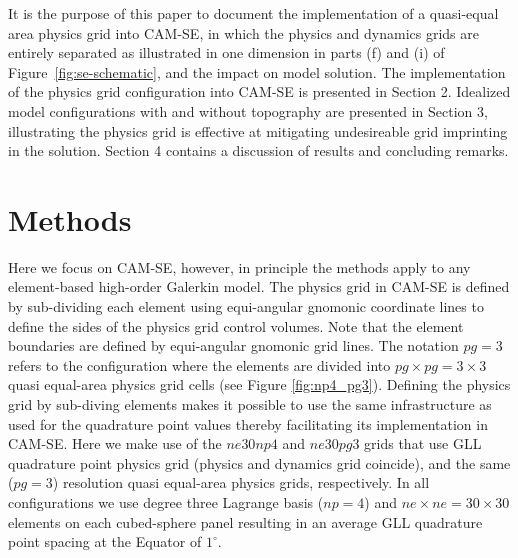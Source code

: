 \documentclass[twocol]{ametsoc}
\begin{document}


It is the purpose of this paper to document the implementation of a quasi-equal area physics grid into CAM-SE, in which the physics and dynamics grids are entirely separated as illustrated in one dimension in parts (f) and (i) of Figure~\ref{fig:se-schematic}, and the impact on model solution. The implementation of the physics grid configuration into CAM-SE is presented in Section 2. Idealized model configurations with and without topography are presented in Section 3, illustrating the physics grid is effective at mitigating undesireable grid imprinting in the solution. Section 4 contains a discussion of results and concluding remarks. 

\section{Methods}
Here we focus on CAM-SE, however, in principle the methods apply to any element-based high-order Galerkin model. The physics grid in CAM-SE is defined by sub-dividing each element using equi-angular gnomonic coordinate lines to define the sides of the physics grid control volumes. Note that the element boundaries are defined by equi-angular gnomonic grid lines. The notation $pg=3$ refers to the configuration where the elements are divided into $pg\times pg=3\times 3$ quasi equal-area physics grid cells (see Figure \ref{fig:np4_pg3}). Defining the physics grid by sub-diving elements makes it possible to use the same infrastructure as used for the quadrature point values thereby facilitating its implementation in CAM-SE. Here we make use of the $ne30np4$ and $ne30pg3$ grids that use GLL quadrature point physics grid (physics and dynamics grid coincide), and the same ($pg=3$) resolution quasi equal-area physics grids, respectively. In all configurations we use degree three Lagrange basis ($np=4$) and $ne\times ne=30\times 30$ elements on each cubed-sphere panel resulting in an average GLL quadrature point spacing at the Equator of $1^\circ$. %
\end{document}
